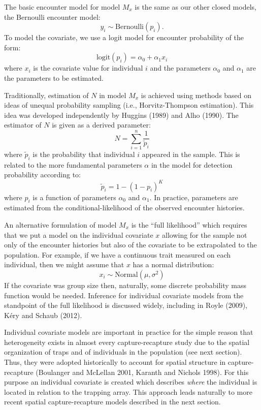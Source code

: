 \documentclass{book}
\begin{document}
The basic encounter model for model $M_x$ is the same as our other
closed models, the Bernoulli encounter model:
\[
y_{i} \sim \mbox{Bernoulli}(p_{i}).
\]
To model the covariate, we use a logit model for encounter probability
of the form:
\begin{equation}
 \mbox{logit}(p_{i}) = \alpha_0 + \alpha_1 x_{i}
\end{equation}
where $x_i$ is the covariate value for individual $i$ and the
parameters $\alpha_0$ and $\alpha_1$ are the parameters to be
estimated.

Traditionally, estimation of $N$ in model $M_{x}$ is achieved using
methods based on ideas of unequal probability sampling (i.e.,
Horvitz-Thompson estimation). This idea was developed independently by
Huggins (1989) and Alho (1990). The estimator of $N$ is given as a
derived parameter:
\[
\hat{N} = \sum_{i=1}^{n} \frac{1}{\tilde{p}_{i}}
\]
where $\tilde{p}_{i}$ is the probability that individual $i$ appeared
in the sample.  This is related to the more fundamental parameters
$\alpha$ in the model for detection probability according to:
\[
\tilde{p}_{i}  = 1- (1-p_{i})^K
\]
where $p_{i}$ is a function of parameters $\alpha_{0}$ and
$\alpha_{1}$.  In practice, parameters are estimated from the
conditional-likelihood of the observed encounter histories.

An alternative formulation of model $M_x$ is the ``full likelihood''
which requires that we put a model on the individual covariate $x$
allowing for the sample not only of the encounter histories but also
of the covariate to be extrapolated to the population.  For example,
if we have a continuous trait measured on each individual, then we
might assume that $x$ has a normal distribution:
\[
x_{i} \sim \mbox{Normal}(\mu,\sigma^{2})
\]
If the covariate was group size then, naturally, some discrete
probability mass function would be needed. Inference for individual
covariate models from the standpoint of the  full likelihood is
discussed widely, including in Royle (2009), K\'{e}ry and Schaub (2012).

Individual covariate models are important in practice for the simple
reason that heterogeneity exists in almost every capture-recapture
study due to the spatial organization of traps and of individuals in
the population (see next section). Thus, they were adopted historically
to account for spatial structure in capture-recapture (Boulanger and
McLellan 2001, Karanth and Nichols 1998).  For this purpose an
individual covariate is created which describes {\it where} the
individual is located in relation to the trapping array.  This
approach leads naturally to more recent spatial capture-recapture
models described in the next section.
\end{document}
